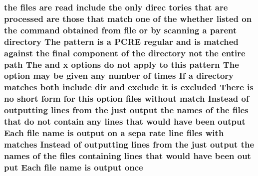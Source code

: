 \subsubsection[{\texorpdfstring{once}{once}}]{ the {\bf files} {\bf are} {\bf read} {\bf include} the only direc tories that {\bf are} processed {\bf are} those that {\bf match} one {\bf of} the whether listed {\bf on} the {\bf command} obtained {\bf from} {\bf file} {\bf or} by {\bf scanning} {\bf a} {\bf parent} {\bf directory} The {\bf pattern} {\bf is} {\bf a} {\bf P\+C\+RE} regular and {\bf is} {\bf matched} against the final {\bf component} {\bf of} the {\bf directory} {\bf not} the entire {\bf path} The and {\bf x} {\bf options} {\bf do} {\bf not} apply {\bf to} {\bf this} {\bf pattern} The {\bf option} may {\bf be} {\bf given} {\bf any} {\bf number} {\bf of} {\bf times} If {\bf a} {\bf directory} {\bf matches} both {\bf include} {\bf dir} and {\bf exclude} {\bf it} {\bf is} {\bf excluded} There {\bf is} no short form for {\bf this} {\bf option} {\bf files} without {\bf match} {\bf Instead} {\bf of} outputting {\bf lines} {\bf from} the just {\bf output} the {\bf names} {\bf of} the {\bf files} that {\bf do} {\bf not} contain {\bf any} {\bf lines} that would have been {\bf output} Each {\bf file} {\bf name} {\bf is} {\bf output} {\bf on} {\bf a} sepa rate {\bf line} {\bf files} {\bf with} {\bf matches} {\bf Instead} {\bf of} outputting {\bf lines} {\bf from} the just {\bf output} the {\bf names} {\bf of} the {\bf files} containing {\bf lines} that would have been {\bf out} put Each {\bf file} {\bf name} {\bf is} {\bf output} once}\hypertarget{basic-configuration_8txt_aab182d126ab6b06fdffef58b1a664ca1}{}\label{basic-configuration_8txt_aab182d126ab6b06fdffef58b1a664ca1}
